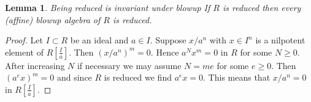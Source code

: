 \documentclass[10pt,a4paper]{amsart}
\newenvironment{slogan}{\comment}{\endcomment}
\theoremstyle{plain}
\newtheorem{lemma}[subsection]{Lemma}
\theoremstyle{definition}
\theoremstyle{remark}
\numberwithin{equation}{subsection}
\begin{document}
\begin{lemma}
\label{lemma-blowup-reduced}
\begin{slogan}
Being reduced is invariant under blowup
\end{slogan}
If $R$ is reduced then every (affine) blowup algebra of $R$ is reduced.
\end{lemma}

\begin{proof}
Let $I \subset R$ be an ideal and $a \in I$. Suppose $x/a^n$ with
$x \in I^n$ is a nilpotent element of $R[\frac{I}{a}]$. Then
$(x/a^n)^m = 0$. Hence $a^N x^m = 0$ in $R$ for some $N \geq 0$.
After increasing $N$ if necessary we may assume $N = me$ for some
$e \geq 0$. Then $(a^e x)^m = 0$ and since $R$ is reduced we find
$a^e x = 0$. This means that $x/a^n = 0$ in $R[\frac{I}{a}]$.
\end{proof}
\end{document}
